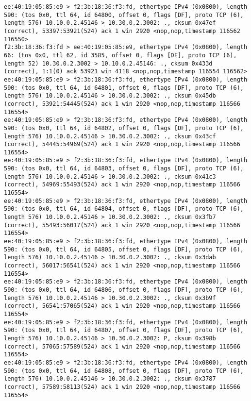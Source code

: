 \documentclass[a4paper,12pt]{article}
\begin{document}
\begin{Verbatim}
ee:40:19:05:85:e9 > f2:3b:18:36:f3:fd, ethertype IPv4 (0x0800), length 590: (tos 0x0, ttl 64, id 64800, offset 0, flags [DF], proto TCP (6), length 576) 10.10.0.2.45146 > 10.30.0.2.3002: ., cksum 0x47ef (correct), 53397:53921(524) ack 1 win 2920 <nop,nop,timestamp 116562 116550>
f2:3b:18:36:f3:fd > ee:40:19:05:85:e9, ethertype IPv4 (0x0800), length 66: (tos 0x0, ttl 62, id 3585, offset 0, flags [DF], proto TCP (6), length 52) 10.30.0.2.3002 > 10.10.0.2.45146: ., cksum 0x433d (correct), 1:1(0) ack 53921 win 4118 <nop,nop,timestamp 116554 116562>
ee:40:19:05:85:e9 > f2:3b:18:36:f3:fd, ethertype IPv4 (0x0800), length 590: (tos 0x0, ttl 64, id 64801, offset 0, flags [DF], proto TCP (6), length 576) 10.10.0.2.45146 > 10.30.0.2.3002: ., cksum 0x45db (correct), 53921:54445(524) ack 1 win 2920 <nop,nop,timestamp 116566 116554>
ee:40:19:05:85:e9 > f2:3b:18:36:f3:fd, ethertype IPv4 (0x0800), length 590: (tos 0x0, ttl 64, id 64802, offset 0, flags [DF], proto TCP (6), length 576) 10.10.0.2.45146 > 10.30.0.2.3002: ., cksum 0x43cf (correct), 54445:54969(524) ack 1 win 2920 <nop,nop,timestamp 116566 116554>
ee:40:19:05:85:e9 > f2:3b:18:36:f3:fd, ethertype IPv4 (0x0800), length 590: (tos 0x0, ttl 64, id 64803, offset 0, flags [DF], proto TCP (6), length 576) 10.10.0.2.45146 > 10.30.0.2.3002: ., cksum 0x41c3 (correct), 54969:55493(524) ack 1 win 2920 <nop,nop,timestamp 116566 116554>
ee:40:19:05:85:e9 > f2:3b:18:36:f3:fd, ethertype IPv4 (0x0800), length 590: (tos 0x0, ttl 64, id 64804, offset 0, flags [DF], proto TCP (6), length 576) 10.10.0.2.45146 > 10.30.0.2.3002: ., cksum 0x3fb7 (correct), 55493:56017(524) ack 1 win 2920 <nop,nop,timestamp 116566 116554>
ee:40:19:05:85:e9 > f2:3b:18:36:f3:fd, ethertype IPv4 (0x0800), length 590: (tos 0x0, ttl 64, id 64805, offset 0, flags [DF], proto TCP (6), length 576) 10.10.0.2.45146 > 10.30.0.2.3002: ., cksum 0x3dab (correct), 56017:56541(524) ack 1 win 2920 <nop,nop,timestamp 116566 116554>
ee:40:19:05:85:e9 > f2:3b:18:36:f3:fd, ethertype IPv4 (0x0800), length 590: (tos 0x0, ttl 64, id 64806, offset 0, flags [DF], proto TCP (6), length 576) 10.10.0.2.45146 > 10.30.0.2.3002: ., cksum 0x3b9f (correct), 56541:57065(524) ack 1 win 2920 <nop,nop,timestamp 116566 116554>
ee:40:19:05:85:e9 > f2:3b:18:36:f3:fd, ethertype IPv4 (0x0800), length 590: (tos 0x0, ttl 64, id 64807, offset 0, flags [DF], proto TCP (6), length 576) 10.10.0.2.45146 > 10.30.0.2.3002: P, cksum 0x398b (correct), 57065:57589(524) ack 1 win 2920 <nop,nop,timestamp 116566 116554>
ee:40:19:05:85:e9 > f2:3b:18:36:f3:fd, ethertype IPv4 (0x0800), length 590: (tos 0x0, ttl 64, id 64808, offset 0, flags [DF], proto TCP (6), length 576) 10.10.0.2.45146 > 10.30.0.2.3002: ., cksum 0x3787 (correct), 57589:58113(524) ack 1 win 2920 <nop,nop,timestamp 116566 116554>

\end{Verbatim}
\end{document}
